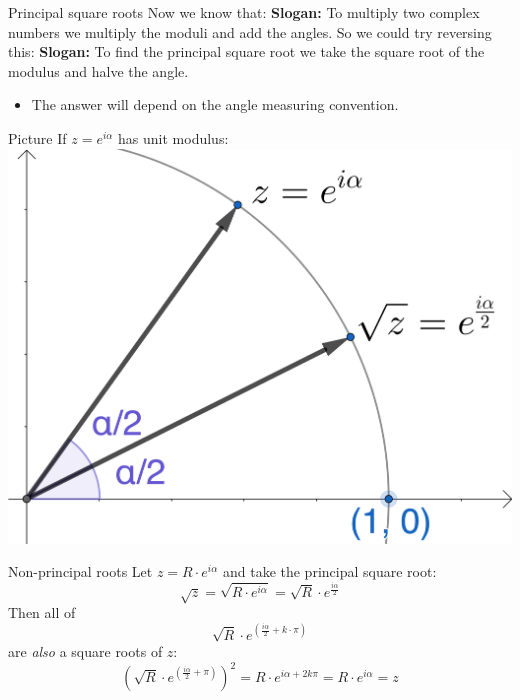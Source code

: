 \documentclass{beamer}
\begin{document}
\begin{frame}{Principal square roots}
Now we know that:\vfill
{\bf Slogan:} To multiply two complex numbers we multiply the moduli and add the angles.\vfill
So we could try reversing this:\vfill
{\bf Slogan:} To find the principal square root we take the square root of the modulus and halve the angle.\vfill
\begin{itemize}
	\item The answer will depend on the angle measuring convention.
\end{itemize}
\end{frame}

\begin{frame}{Picture}
If $z = e^{i\alpha}$ has unit modulus:\vfill
\includegraphics[scale=5]{principal-square-root.png}
\end{frame}

\begin{frame}{Non-principal roots}
Let $z = R\cdot e^{i\alpha}$ and take the principal square root:\vfill
\begin{equation*}
\sqrt{z} = \sqrt{R\cdot e^{i\alpha}} = \sqrt{R}\cdot e^{\frac{i\alpha}{2}}
\end{equation*}\vfill
Then all of\vfill
\begin{equation*}
\sqrt{R}\cdot e^{(\frac{i\alpha}{2}+k\cdot\pi)}
\end{equation*}\vfill
are \emph{also} a square roots of $z$:\vfill
\begin{equation*}
\left(\sqrt{R}\cdot e^{(\frac{i\alpha}{2}+\pi)}\right)^2 = R\cdot e^{i\alpha + 2k\pi} = R\cdot e^{i\alpha} = z
\end{equation*}
\end{frame}
\end{document}
